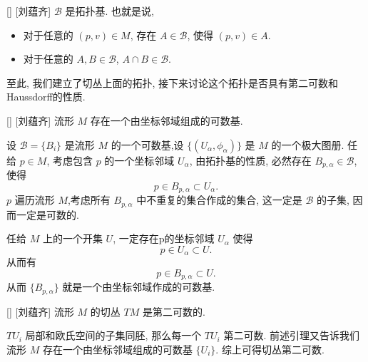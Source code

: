 \documentclass[UTF8]{ctexart}
\begin{document}
        \begin{ppt}
            []
            {}
            []
            [刘蕴齐]
             \(\mathcal{B}\) 是拓扑基. 也就是说,
            \begin{itemize}
                \item 对于任意的 \((p,v) \in M\), 存在 \(A \in \mathcal{B}\), 使得 \((p,v) \in A\). 
                \item 对于任意的 \(A, B \in \mathcal{B}\),  \(A \cap B \in \mathcal{B}\). 
            \end{itemize}
        \end{ppt}

        至此, 我们建立了切丛上面的拓扑, 接下来讨论这个拓扑是否具有第二可数和Haussdorff的性质. 
        
        \begin{lma}
            []
            {}
            []
            [刘蕴齐]
            流形 \(M\) 存在一个由坐标邻域组成的可数基. 
        \end{lma}

        \begin{prf}
            设 \(\mathcal{B} = \{B_i\}\) 是流形 \(M\) 的一个可数基,设 \(\{(U_{\alpha}, \phi_{\alpha})\}\) 是 \(M\) 的一个极大图册. 
            任给 \(p \in M\), 考虑包含 \(p\) 的一个坐标邻域 \(U_{\alpha}\), 由拓扑基的性质, 必然存在 \(B_{p,\alpha} \in \mathcal{B}\), 使得
            \[
                p \in B_{p,\alpha} \subset U_{\alpha}.
            \]
             \(p\) 遍历流形 \(M\),考虑所有 \(B_{p,\alpha}\) 中不重复的集合作成的集合, 这一定是 \(\mathcal{B}\) 的子集, 因而一定是可数的. 

            任给 \(M\) 上的一个开集 \(U\), 一定存在p的坐标邻域 \(U_{\alpha}\) 使得
            \[
                p \in U_{\alpha} \subset U.
            \]
            从而有
            \[
                p \in B_{p,\alpha} \subset U.
            \]
            从而 \(\{B_{p,\alpha}\}\) 就是一个由坐标邻域作成的可数基. 
        \end{prf}

        \begin{ppt}
            []
            {}
            []
            [刘蕴齐]
            流形 \(M\) 的切丛 \(TM\) 是第二可数的. 
        \end{ppt}

        \begin{prf}
             \(T U_i\) 局部和欧氏空间的子集同胚, 那么每一个 \(T U_i\) 第二可数. 前述引理又告诉我们流形 \(M\) 存在一个由坐标邻域组成的可数基 \(\{U_i\}\). 综上可得切丛第二可数. 
        \end{prf}
\end{document}
